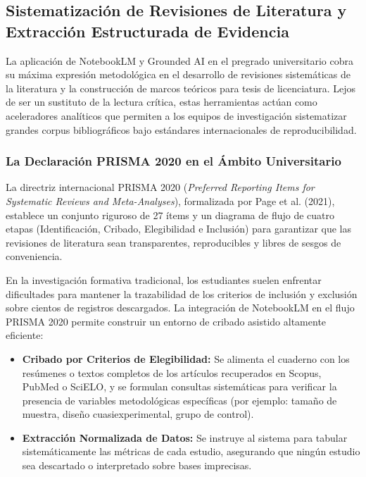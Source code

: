 \vspace{0.4cm}

\subsection{Sistematización de Revisiones de Literatura y Extracción Estructurada de Evidencia}

La aplicación de NotebookLM y Grounded AI en el pregrado universitario cobra su máxima expresión metodológica en el desarrollo de revisiones sistemáticas de la literatura y la construcción de marcos teóricos para tesis de licenciatura. Lejos de ser un sustituto de la lectura crítica, estas herramientas actúan como aceleradores analíticos que permiten a los equipos de investigación sistematizar grandes corpus bibliográficos bajo estándares internacionales de reproducibilidad.

\subsubsection{La Declaración PRISMA 2020 en el Ámbito Universitario}

La directriz internacional PRISMA 2020 (\textit{Preferred Reporting Items for Systematic Reviews and Meta-Analyses}), formalizada por Page et al. (2021), establece un conjunto riguroso de 27 ítems y un diagrama de flujo de cuatro etapas (Identificación, Cribado, Elegibilidad e Inclusión) para garantizar que las revisiones de literatura sean transparentes, reproducibles y libres de sesgos de conveniencia.

En la investigación formativa tradicional, los estudiantes suelen enfrentar dificultades para mantener la trazabilidad de los criterios de inclusión y exclusión sobre cientos de registros descargados. La integración de NotebookLM en el flujo PRISMA 2020 permite construir un entorno de cribado asistido altamente eficiente:

\begin{itemize}
    \item \textbf{Cribado por Criterios de Elegibilidad:} Se alimenta el cuaderno con los resúmenes o textos completos de los artículos recuperados en Scopus, PubMed o SciELO, y se formulan consultas sistemáticas para verificar la presencia de variables metodológicas específicas (por ejemplo: tamaño de muestra, diseño cuasiexperimental, grupo de control).
    \item \textbf{Extracción Normalizada de Datos:} Se instruye al sistema para tabular sistemáticamente las métricas de cada estudio, asegurando que ningún estudio sea descartado o interpretado sobre bases imprecisas.
\end{itemize}

